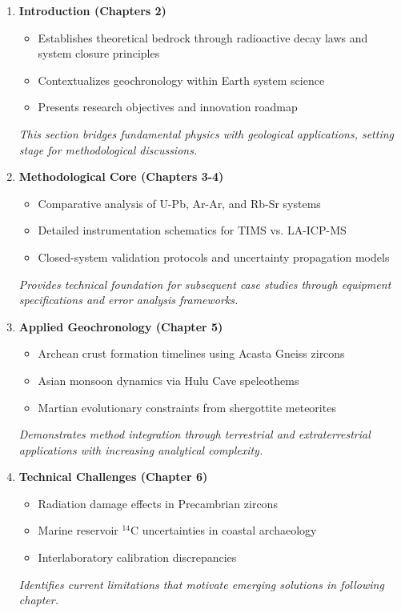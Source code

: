 \documentclass{article}
\begin{document}
\begin{enumerate}
    \item \textbf{Introduction (Chapters 2)}
    \begin{itemize}
        \item Establishes theoretical bedrock through radioactive decay laws and system closure principles
        \item Contextualizes geochronology within Earth system science
        \item Presents research objectives and innovation roadmap
    \end{itemize}
    \textit{This section bridges fundamental physics with geological applications, setting stage for methodological discussions.}

    \item \textbf{Methodological Core (Chapters 3-4)}
    \begin{itemize}
        \item Comparative analysis of U-Pb, Ar-Ar, and Rb-Sr systems
        \item Detailed instrumentation schematics for TIMS vs. LA-ICP-MS
        \item Closed-system validation protocols and uncertainty propagation models
    \end{itemize}
    \textit{Provides technical foundation for subsequent case studies through equipment specifications and error analysis frameworks.}

    \item \textbf{Applied Geochronology (Chapter 5)}
    \begin{itemize}
        \item Archean crust formation timelines using Acasta Gneiss zircons
        \item Asian monsoon dynamics via Hulu Cave speleothems
        \item Martian evolutionary constraints from shergottite meteorites
    \end{itemize}
    \textit{Demonstrates method integration through terrestrial and extraterrestrial applications with increasing analytical complexity.}

    \item \textbf{Technical Challenges (Chapter 6)}
    \begin{itemize}
        \item Radiation damage effects in Precambrian zircons
        \item Marine reservoir $^{14}$C uncertainties in coastal archaeology
        \item Interlaboratory calibration discrepancies
    \end{itemize}
    \textit{Identifies current limitations that motivate emerging solutions in following chapter.}


\end{enumerate}
\end{document}
